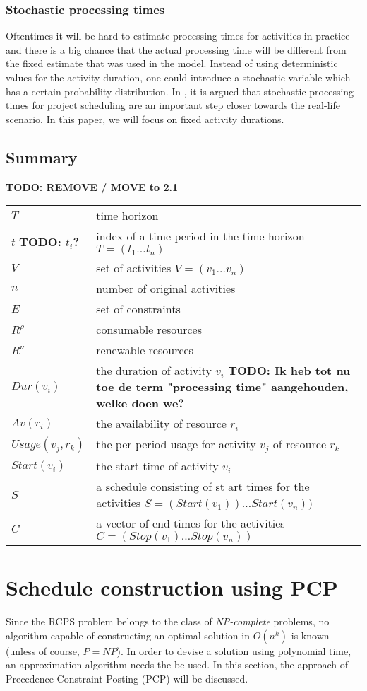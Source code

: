 \documentclass{article}
\newcommand{\TODO}[1]{{\color{red}\textbf{TODO: #1}}}
\newcommand{\renres}[0]{R^\rho} %
\newcommand{\conres}[0]{R^\nu} %
\newcommand{\av}[1]{\textit{Av}(#1)} %
\newcommand{\dur}[1]{\textit{Dur}(#1)} %
\newcommand{\usage}[1]{\textit{Usage}(#1)} %
\newcommand{\start}[1]{\textit{Start}(#1)} %
\begin{document}
\subsubsection{Stochastic processing times}
Oftentimes it will be hard to estimate processing times for activities in practice and there is a big chance that the actual processing time will be different from the fixed estimate that was used in the model. Instead of using deterministic values for the activity duration, one could introduce a stochastic variable which has a certain probability distribution. In \cite{brucker99}, it is argued that stochastic processing times for project scheduling are an important step closer towards the real-life scenario. In this paper, we will focus on fixed activity durations.

\subsection{Summary}
\TODO{REMOVE / MOVE to 2.1}
\begin{tabular}{l l}
\hline
$T$ & time horizon \\
$t$ \TODO{$t_i$?} &  index of a time period in the time horizon $T = (t_1 \ldots t_n)$\\
$V$ & set of activities $V = (v_1 \ldots v_n)$ \\
$n$ & number of original activities \\
$E$ & set of constraints \\
$\renres$ & consumable resources \\
$\conres$ & renewable resources \\
$\dur{v_i}$ & the duration of activity $v_i$ \TODO{Ik heb tot nu toe de term "processing time" aangehouden, welke doen we?}\\
$\av{r_i}$ & the availability of resource $r_i$ \\
$\usage{v_j, r_k}$ & the per period usage for activity $v_j$ of resource $r_k$ \\
$\start{v_i}$ & the start time of activity $v_i$ \\
$S$ & a schedule consisting of st
art times for the activities $S = (\start{v_1}) \ldots \start{v_n})$ \\
$C$ & a vector of end times for the activities $C = (Stop(v_1) \ldots Stop(v_n))$ \\
\hline
\end{tabular}

\newpage

\section{Schedule construction using PCP}
Since the RCPS problem belongs to the class of \emph{NP-complete} problems, no algorithm capable of constructing an optimal solution in $O(n^k)$ is known (unless of course, $P=NP$). In order to devise a solution using polynomial time, an approximation algorithm needs the be used. In this section, the approach of Precedence Constraint Posting (PCP) will be discussed.
\end{document}
